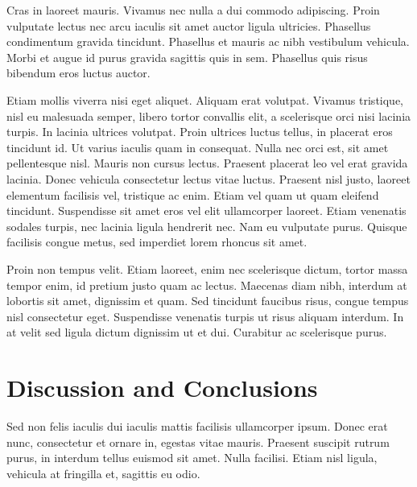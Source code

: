 \documentclass{emulateapj}
\begin{document}
Cras in laoreet mauris. Vivamus nec nulla a dui commodo
adipiscing. Proin vulputate lectus nec arcu iaculis sit amet auctor
ligula ultricies. Phasellus condimentum gravida tincidunt. Phasellus
et mauris ac nibh vestibulum vehicula. Morbi et augue id purus gravida
sagittis quis in sem. Phasellus quis risus bibendum eros luctus
auctor.

Etiam mollis viverra nisi eget aliquet. Aliquam erat volutpat. Vivamus
tristique, nisl eu malesuada semper, libero tortor convallis elit, a
scelerisque orci nisi lacinia turpis. In lacinia ultrices
volutpat. Proin ultrices luctus tellus, in placerat eros tincidunt
id. Ut varius iaculis quam in consequat. Nulla nec orci est, sit amet
pellentesque nisl. Mauris non cursus lectus. Praesent placerat leo vel
erat gravida lacinia. Donec vehicula consectetur lectus vitae
luctus. Praesent nisl justo, laoreet elementum facilisis vel,
tristique ac enim. Etiam vel quam ut quam eleifend
tincidunt. Suspendisse sit amet eros vel elit ullamcorper
laoreet. Etiam venenatis sodales turpis, nec lacinia ligula hendrerit
nec. Nam eu vulputate purus. Quisque facilisis congue metus, sed
imperdiet lorem rhoncus sit amet.

Proin non tempus velit. Etiam laoreet, enim nec scelerisque dictum,
tortor massa tempor enim, id pretium justo quam ac lectus. Maecenas
diam nibh, interdum at lobortis sit amet, dignissim et quam. Sed
tincidunt faucibus risus, congue tempus nisl consectetur
eget. Suspendisse venenatis turpis ut risus aliquam interdum. In at
velit sed ligula dictum dignissim ut et dui. Curabitur ac scelerisque
purus.



\section{Discussion and Conclusions}
Sed non felis iaculis dui iaculis mattis facilisis ullamcorper
ipsum. Donec erat nunc, consectetur et ornare in, egestas vitae
mauris. Praesent suscipit rutrum purus, in interdum tellus euismod sit
amet. Nulla facilisi. Etiam nisl ligula, vehicula at fringilla et,
sagittis eu odio.
\end{document}
